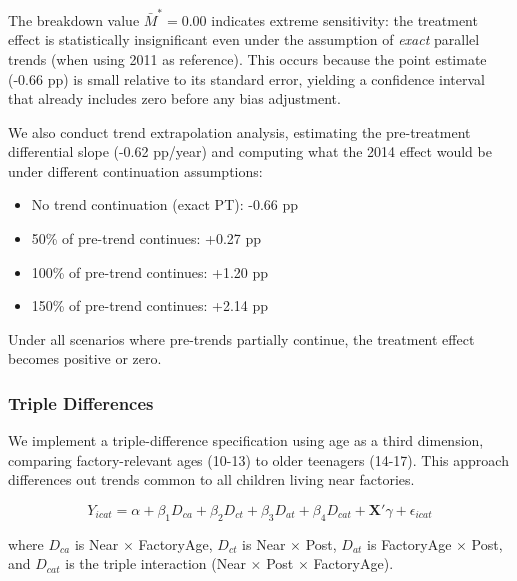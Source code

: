 The breakdown value $\bar{M}^* = 0.00$ indicates extreme sensitivity: the treatment effect is statistically insignificant even under the assumption of \textit{exact} parallel trends (when using 2011 as reference). This occurs because the point estimate (-0.66 pp) is small relative to its standard error, yielding a confidence interval that already includes zero before any bias adjustment.

We also conduct trend extrapolation analysis, estimating the pre-treatment differential slope (-0.62 pp/year) and computing what the 2014 effect would be under different continuation assumptions:

\begin{itemize}
\item No trend continuation (exact PT): -0.66 pp
\item 50\% of pre-trend continues: +0.27 pp
\item 100\% of pre-trend continues: +1.20 pp
\item 150\% of pre-trend continues: +2.14 pp
\end{itemize}

Under all scenarios where pre-trends partially continue, the treatment effect becomes positive or zero.

\subsubsection{Triple Differences}

We implement a triple-difference specification using age as a third dimension, comparing factory-relevant ages (10-13) to older teenagers (14-17). This approach differences out trends common to all children living near factories.

\begin{equation}
Y_{icat} = \alpha + \beta_1 D_{ca} + \beta_2 D_{ct} + \beta_3 D_{at} + \beta_4 D_{cat} + \mathbf{X}'\gamma + \epsilon_{icat}
\end{equation}

where $D_{ca}$ is Near $\times$ FactoryAge, $D_{ct}$ is Near $\times$ Post, $D_{at}$ is FactoryAge $\times$ Post, and $D_{cat}$ is the triple interaction (Near $\times$ Post $\times$ FactoryAge).

